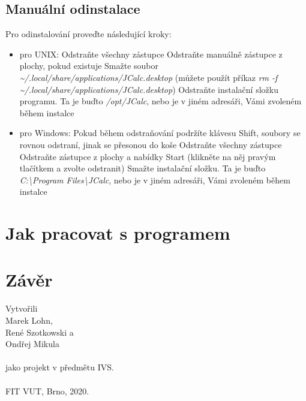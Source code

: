 \documentclass[a4paper, 11pt]{article}
\begin{document}
\subsection{Manuální odinstalace}

Pro odinstalování proveďte následující kroky:

\begin{itemize}
	\item pro UNIX:
		\subitem Odstraňte všechny zástupce
			\subsubitem Odstraňte manuálně zástupce z plochy, pokud existuje
			\subsubitem Smažte soubor \emph{\textasciitilde/.local/share/applications/JCalc.desktop}
			\subsubitem (můžete použít příkaz \emph{rm -f \textasciitilde/.local/share/applications/JCalc.desktop})
		\subitem Odstraňte instalační složku programu. Ta je buďto \emph{/opt/JCalc}, nebo je v jiném adresáři, Vámi zvoleném během instalce
			
	\item pro Windows:
		\subitem Pokud během odstraňování podržíte klávesu Shift, soubory se rovnou odstraní, jinak se přesonou do koše
		\subitem Odstraňte všechny zástupce
			\subsubitem Odstraňte zástupce z plochy a nabídky Start (klikněte na něj pravým tlačítkem a zvolte odstranit)
		\subitem Smažte instalační složku. Ta je buďto \emph{C:\textbackslash Program Files\textbackslash JCalc}, nebo je v jiném adresáři, Vámi zvoleném během instalce
\end{itemize}

\section{Jak pracovat s programem}

\section{Závěr}

Vytvořili\\Marek Lohn,\\René Szotkowski a\\Ondřej Mikula\\\\jako projekt v předmětu IVS.\\\\
FIT VUT, Brno, 2020.
\end{document}
